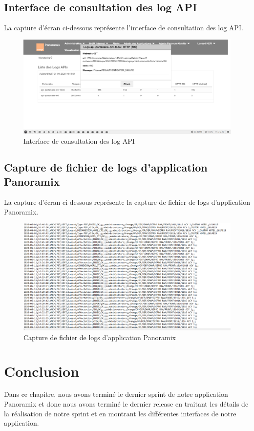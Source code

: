 \subsection{Interface de consultation des log API}
La capture d'écran ci-dessous représente l’interface de consultation des log API.
\begin{figure}[H]
	\centering
	\includegraphics[width=0.7\linewidth]{"img/screenshots/logs + srcd/detailed log"}
	\caption[Interface de consultation des log API]{Interface de consultation des log API}
	\label{fig:detailed-log}
\end{figure}

\subsection{Capture de fichier de logs d’application Panoramix}
La capture d'écran ci-dessous représente la capture de fichier de logs d’application Panoramix.
\begin{figure}[H]
	\centering
	\includegraphics[width=1\linewidth]{"img/screenshots/logs + srcd/log-application"}
	\caption[Capture de fichier de logs d’application Panoramix]{Capture de fichier de logs d’application Panoramix}
	\label{fig:log-application}
\end{figure}

\section*{Conclusion}
Dans ce chapitre, nous avons terminé le dernier sprint de notre application Panoramix et donc nous avons terminé le dernier release en traitant les détails de la réalisation de notre sprint et en montrant les différentes interfaces de notre application.






